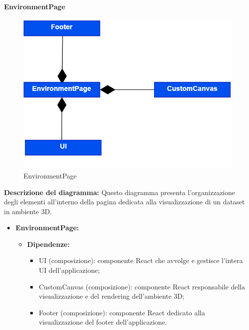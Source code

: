 \paragraph{EnvironmentPage}
\begin{figure}[h!] \centering
      \includegraphics[scale=0.3]{template/images/uml_front/ui/EnvironmentPage.png}
      \caption{EnvironmentPage}
\end{figure}
\textbf{Descrizione del diagramma:}
Questo diagramma presenta l'organizzazione degli elementi all'interno della pagina dedicata alla visualizzazione di un dataset in ambiente 3D.
\begin{itemize}
      \item \textbf{EnvironmentPage:}
            \begin{itemize}
                  \item \textbf{Dipendenze:}
                        \begin{itemize}
                              \item UI (composizione): componente React che avvolge e gestisce l'intera UI
                                    dell'applicazione;
                              \item CustomCanvas (composizione): componente React responsabile della
                                    visualizzazione e del rendering dell'ambiente 3D;
                              \item Footer (composizione): componente React dedicato alla visualizzazione del
                                    footer dell'applicazione.
                        \end{itemize}
            \end{itemize}
\end{itemize}

